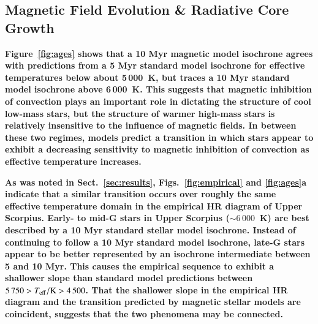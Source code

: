 \documentclass{aa}
\begin{document}
\subsection{Magnetic Field Evolution \& Radiative Core Growth}
\label{sec:dynamo}

{\bf Figure~\ref{fig:ages} shows that a 10 Myr magnetic model isochrone agrees with predictions from a 5 Myr standard model isochrone for effective temperatures below about 5\,000~K, but traces a 10 Myr standard model isochrone above 6\,000~K. This suggests that magnetic inhibition of convection plays an important role in dictating the structure of cool low-mass stars, but the structure of warmer high-mass stars is relatively insensitive to the influence of magnetic fields. In between these two regimes, models predict a transition in which stars appear to exhibit a decreasing sensitivity to magnetic inhibition of convection as effective temperature increases. }

{\bf As was noted in Sect.~\ref{sec:results}, Figs.~\ref{fig:empirical} and \ref{fig:ages}a indicate that a similar transition occurs over roughly the same effective temperature domain in the empirical HR diagram of Upper Scorpius. Early- to mid-G stars in Upper Scorpius (\teff$ \sim 6\,000$~K) are best described by a 10 Myr standard stellar model isochrone. Instead of continuing to follow a 10 Myr standard model isochrone, late-G stars appear to be better represented by an isochrone intermediate between 5 and 10 Myr. This causes the empirical sequence to exhibit a shallower slope than standard model predictions between $5\,750 > T_{\rm eff} / {\rm K} > 4\,500$. 
That the shallower slope in the empirical HR diagram and the transition predicted by magnetic stellar models are coincident, suggests that the two phenomena may be connected.
}
\end{document}
